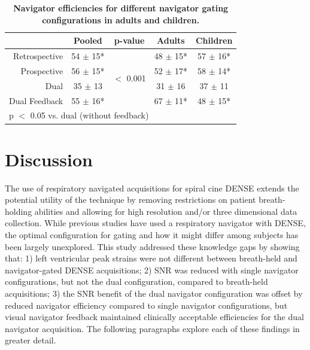 \begin{table}
	\centering
	\caption[Navigator efficiencies for different navigator gating configurations in adults and children]{\textbf{Navigator efficiencies for different navigator gating configurations in adults and children.}}
	\label{table:navigator_navefficiency}
	\begin{tabular}{c c c c c}
		\toprule
		\multicolumn{1}{c}{} & \multicolumn{1}{c}{\textbf{Pooled}} & \multicolumn{1}{c}{\textbf{p-value}} & \multicolumn{1}{c}{\textbf{Adults}} & \multicolumn{1}{c}{\textbf{Children}} \\ \midrule
		\multicolumn{1}{r}{Retrospective}   & \multicolumn{1}{c}{54 $\pm$ 15*} & \multirow{4}{*}{$<$ 0.001} & \multicolumn{1}{c}{48 $\pm$ 15*} & \multicolumn{1}{c}{57 $\pm$ 16*}     \\
		\multicolumn{1}{r}{Prospective}    	& \multicolumn{1}{c}{56 $\pm$ 15*} & & \multicolumn{1}{c}{52 $\pm$ 17*} &  \multicolumn{1}{c}{58 $\pm$ 14*}                \\
		\multicolumn{1}{r}{Dual}      		& \multicolumn{1}{c}{35 $\pm$ 13}  & & \multicolumn{1}{c}{31 $\pm$ 16} &   \multicolumn{1}{c}{37 $\pm$ 11}               \\
		\multicolumn{1}{r}{Dual Feedback}   & \multicolumn{1}{c}{55 $\pm$ 16*} & & \multicolumn{1}{c}{67 $\pm$ 11*} &   \multicolumn{1}{c}{48 $\pm$ 15*}               \\
		\bottomrule
		\multicolumn{5}{l}{\footnotesize* p $<$ 0.05 vs. dual (without feedback)} \\
	\end{tabular}
\end{table}

\section{Discussion}
	The use of respiratory navigated acquisitions for spiral cine DENSE extends the potential utility of the technique by removing restrictions on patient breath-holding abilities and allowing for high resolution \cite{Wehner2014} and/or three dimensional  \cite{Zhong2010a,Kar2014} data collection. While previous studies have used a respiratory navigator with DENSE, the optimal configuration for gating and how it might differ among subjects has been largely unexplored. This study addressed these knowledge gaps by showing that: 1) left ventricular peak strains were not different between breath-held and navigator-gated DENSE acquisitions; 2) SNR was reduced with single navigator configurations, but not the dual configuration, compared to breath-held acquisitions; 3) the SNR benefit of the dual navigator configuration was offset by reduced navigator efficiency compared to single navigator configurations, but visual navigator feedback maintained clinically acceptable efficiencies for the dual navigator acquisition. The following paragraphs explore each of these findings in greater detail.
	
